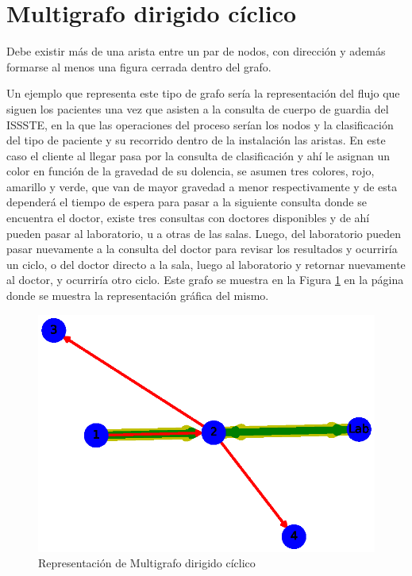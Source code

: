 \documentclass{article}
\begin{document}
\section{Multigrafo dirigido cíclico}

Debe existir más de una arista entre un par de nodos, con dirección y además formarse al menos una figura cerrada dentro del grafo. 

Un ejemplo que representa este tipo de grafo sería la representación del flujo que siguen los pacientes una vez que asisten a la consulta de cuerpo de guardia del ISSSTE, en la que las operaciones del proceso serían los nodos y la clasificación del tipo de paciente y su recorrido dentro de la instalación las aristas. En este caso el cliente al llegar pasa por la consulta de clasificación y ahí le asignan un color en función de la gravedad de su dolencia, se asumen tres colores, rojo, amarillo y verde, que van de mayor gravedad a menor respectivamente y de esta dependerá el tiempo de espera para pasar a la siguiente consulta donde se encuentra el doctor, existe tres consultas con doctores disponibles y de ahí pueden pasar al laboratorio, u a otras de las salas. Luego, del laboratorio pueden pasar nuevamente a la consulta del doctor para revisar los resultados y ocurriría un ciclo, o del doctor directo a la sala, luego al laboratorio y retornar nuevamente al doctor, y ocurriría otro ciclo. Este grafo se muestra en la Figura \ref{fig:Fig11} en la página \pageref{fig:Fig11} donde se muestra la representación gráfica del mismo. 



\begin{figure}
    \centering
    \includegraphics[scale=0.6]{imagenes/Fig11.eps}
    \caption{Representación de Multigrafo dirigido cíclico}
    \label{fig:Fig11}
\end{figure}
\end{document}
